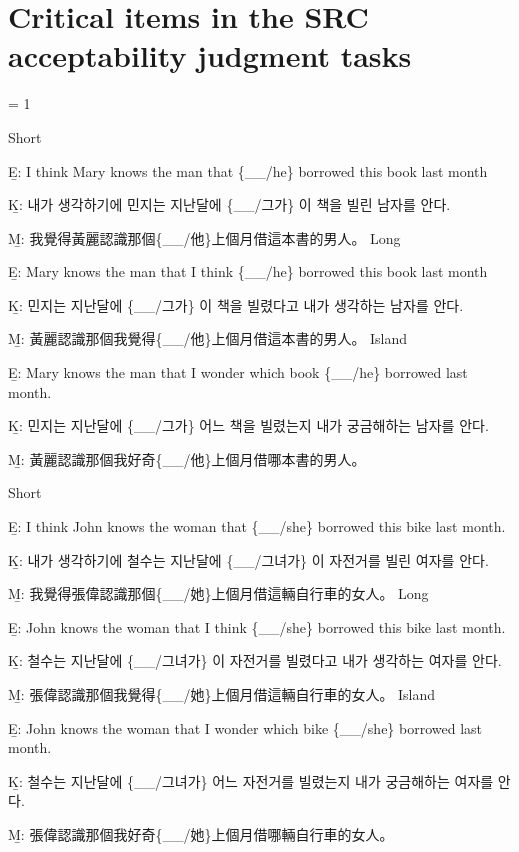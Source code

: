 \section{Critical items in the SRC acceptability judgment tasks}

\excnt = 1

\pex %
\a Short\par\nobreak
\beginsubsub
\b{E:} I think Mary knows the man that \{\_\_/he\} borrowed this book last month\par\nobreak
\b{K:} \ko 내가 생각하기에 민지는 지난달에 \{\_\_/그가\} 이 책을 빌린 남자를 안다. \normalfont\par\nobreak
\b{M:} \zh 我覺得黃麗認識那個\{\_\_/他\}上個月借這本書的男人。 \normalfont
\endsubsub
\a Long\par\nobreak
\beginsubsub
\b{E:} Mary knows the man that I think \{\_\_/he\} borrowed this book last month\par\nobreak
\b{K:} \ko 민지는 지난달에 \{\_\_/그가\} 이 책을 빌렸다고 내가 생각하는 남자를 안다. \normalfont\par\nobreak
\b{M:} \zh 黃麗認識那個我覺得\{\_\_/他\}上個月借這本書的男人。 \normalfont
\endsubsub
\a Island\par\nobreak
\beginsubsub
\b{E:} Mary knows the man that I wonder which book \{\_\_/he\} borrowed last month.\par\nobreak
\b{K:} \ko 민지는 지난달에 \{\_\_/그가\} 어느 책을 빌렸는지 내가 궁금해하는 남자를 안다\normalfont.\par\nobreak
\b{M:} \zh 黃麗認識那個我好奇\{\_\_/他\}上個月借哪本書的男人。\normalfont
\endsubsub
\xe

\pex %
\a Short\par\nobreak
\beginsubsub
\b{E:} I think John knows the woman that \{\_\_/she\} borrowed this bike last month.\par\nobreak
\b{K:} \ko 내가 생각하기에 철수는 지난달에 \{\_\_/그녀가\} 이 자전거를 빌린 여자를 안다. \normalfont\par\nobreak
\b{M:} \zh 我覺得張偉認識那個\{\_\_/她\}上個月借這輛自行車的女人。 \normalfont
\endsubsub
\a Long\par\nobreak
\beginsubsub
\b{E:} John knows the woman that I think \{\_\_/she\} borrowed this bike last month.\par\nobreak
\b{K:} \ko 철수는 지난달에 \{\_\_/그녀가\} 이 자전거를 빌렸다고 내가 생각하는 여자를 안다. \normalfont\par\nobreak
\b{M:} \zh 張偉認識那個我覺得\{\_\_/她\}上個月借這輛自行車的女人。 \normalfont
\endsubsub
\a Island\par\nobreak
\beginsubsub
\b{E:} John knows the woman that I wonder which bike \{\_\_/she\} borrowed last month.\par\nobreak
\b{K:} \ko 철수는 지난달에 \{\_\_/그녀가\} 어느 자전거를 빌렸는지 내가 궁금해하는 여자를 안다\normalfont.\par\nobreak
\b{M:} \zh 張偉認識那個我好奇\{\_\_/她\}上個月借哪輛自行車的女人。\normalfont
\endsubsub
\xe

